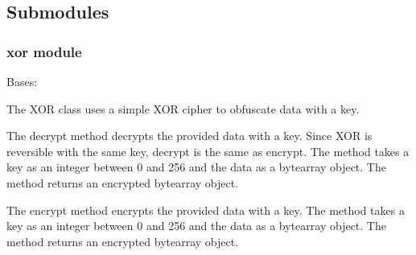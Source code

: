 \documentclass[letterpaper,12pt,openany,oneside]{sphinxmanual}
\begin{document}
\subsection{Submodules}
\label{Encryption:submodules}

\subsubsection{xor module}
\label{Encryption:module-Encryption.xor}\label{Encryption:xor-module}

\begin{fulllineitems}
\label{Encryption:Encryption.xor.XOR}
Bases: 

The XOR class uses a simple XOR cipher to obfuscate data with a key.

\begin{fulllineitems}
\label{Encryption:Encryption.xor.XOR.decrypt}
The decrypt method decrypts the provided data with a key.
Since XOR is reversible with the same key, decrypt is the
same as encrypt.
The method takes a key as an integer between 0 and 256 and
the data as a bytearray object.
The method returns an encrypted bytearray object.

\end{fulllineitems}


\begin{fulllineitems}
\label{Encryption:Encryption.xor.XOR.encrypt}
The encrypt method encrypts the provided data with a key.
The method takes a key as an integer between 0 and 256 and
the data as a bytearray object.
The method returns an encrypted bytearray object.

\end{fulllineitems}


\end{fulllineitems}
\end{document}
